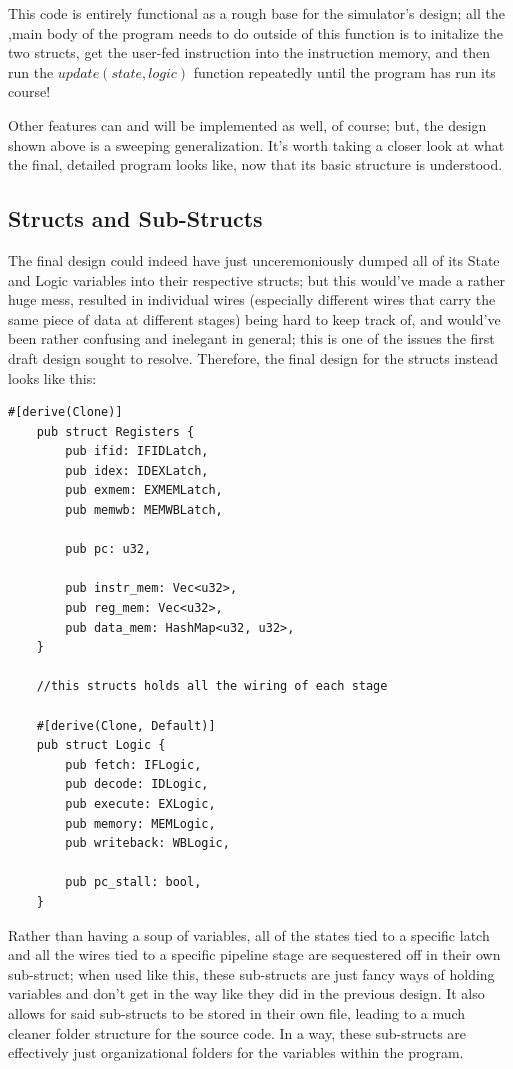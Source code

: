\documentclass[12pt,twoside]{reedthesis}
\begin{document}
This code is entirely functional as a rough base for the simulator's design; all the ,main body of the program needs to do outside of this function is to initalize the two structs, get the user-fed instruction into the instruction memory, and then run the $update(state, logic)$ function repeatedly until the program has run its course!

Other features can and will be implemented as well, of course; but, the design shown above is a sweeping generalization. It's worth taking a closer look at what the final, detailed program looks like, now that its basic structure is understood.

\subsection{Structs and Sub-Structs}

The final design could indeed have just unceremoniously dumped all of its State and Logic variables into their respective structs; but this would've made a rather huge mess, resulted in individual wires (especially different wires that carry the same piece of data at different stages) being hard to keep track of, and would've been rather confusing and inelegant in general; this is one of the issues the first draft design sought to resolve. Therefore, the final design for the structs instead looks like this:

\begin{lstlisting}[caption={Snippet of $components.rs$, holds main 2 structs}]
	#[derive(Clone)]
	pub struct Registers {
		pub ifid: IFIDLatch,
		pub idex: IDEXLatch,
		pub exmem: EXMEMLatch,
		pub memwb: MEMWBLatch,

		pub pc: u32,

		pub instr_mem: Vec<u32>,
		pub reg_mem: Vec<u32>,
		pub data_mem: HashMap<u32, u32>,
	}

	//this structs holds all the wiring of each stage

	#[derive(Clone, Default)]
	pub struct Logic {
		pub fetch: IFLogic,
		pub decode: IDLogic,
		pub execute: EXLogic,
		pub memory: MEMLogic,
		pub writeback: WBLogic,

		pub pc_stall: bool,
	}
\end{lstlisting}

Rather than having a soup of variables, all of the states tied to a specific latch and all the wires tied to a specific pipeline stage are sequestered off in their own sub-struct; when used like this, these sub-structs are just fancy ways of holding variables and don't get in the way like they did in the previous design. It also allows for said sub-structs to be stored in their own file, leading to a much cleaner folder structure for the source code. In a way, these sub-structs are effectively just organizational folders for the variables within the program.
\end{document}
